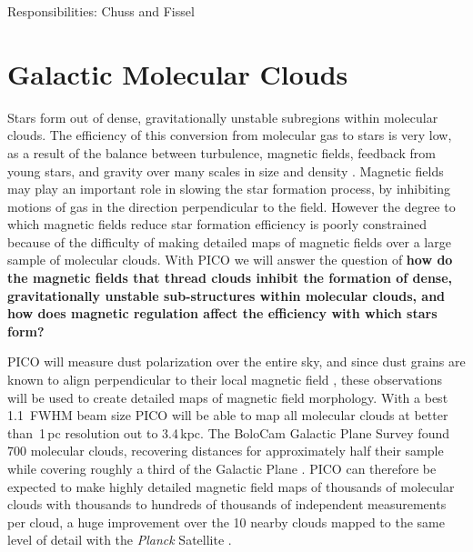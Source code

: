 \documentclass[PICOReport.tex]{subfiles}
\begin{document}
Responsibilities: Chuss and Fissel

\section{Galactic Molecular Clouds}
Stars form out of dense, gravitationally unstable subregions within molecular clouds. The efficiency of this conversion from molecular gas to stars is very low, as a result of the balance between turbulence, magnetic fields, feedback from young stars, and gravity over many scales in size and density \citep{McKee2007}.  Magnetic fields may play an important role in slowing the star formation process, by inhibiting motions of gas in the direction perpendicular to the field. However the degree to which 
magnetic fields reduce star formation efficiency is poorly constrained because of the difficulty of making detailed maps of magnetic fields over a large sample of molecular clouds.  With PICO we will answer the question of {\bf how do the magnetic fields that thread clouds inhibit the formation of dense, gravitationally unstable sub-structures within molecular clouds, and how does magnetic regulation affect the efficiency with which stars form?}

PICO will measure dust polarization over the entire sky, and since dust grains are known to align perpendicular to their local magnetic field \citep{Lazarian2007b,Andersson2015}, these observations will be used to create detailed maps of magnetic field morphology. With a best 1.1\arcmin~FWHM beam size PICO will be able to map all molecular clouds at better than \,1\,pc resolution out to 3.4\,kpc.  The BoloCam Galactic Plane Survey found 700 molecular clouds, recovering distances for approximately half their sample while covering roughly a third of the Galactic Plane \citep{EllsworthBowers2015}. PICO can therefore be expected to make highly detailed magnetic field maps of thousands of molecular clouds with thousands to hundreds of thousands of independent measurements per cloud, a huge improvement over the 10 nearby clouds mapped to the same level of detail with the {\em Planck} Satellite \cite{Planck:XXXV}.
\end{document}
